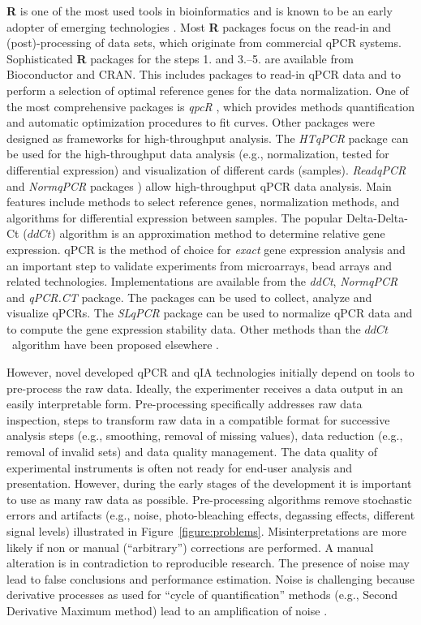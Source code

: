 \documentclass[twocolumn]{bmcart}%
\begin{document}
  \textbf{R} is one of the most used tools in bioinformatics and is known to be 
an early adopter of emerging technologies \cite{pabinger_2014}. Most \textbf{R} 
packages focus on the read-in and (post)-processing of data sets, which 
originate from commercial qPCR systems. Sophisticated 
\textbf{R} packages for the steps 1. and 3.--5. are available 
from Bioconductor and CRAN. This includes packages to read-in qPCR data and to 
perform a selection of optimal reference genes for the data normalization. One 
of the most comprehensive packages is \emph{qpcR} \cite{ritz_2008}, which 
provides methods quantification and automatic optimization procedures to fit 
curves. Other packages were designed as frameworks for high-throughput 
analysis. The \emph{HTqPCR} package \cite{Dvinge_2009} can be used for the 
high-throughput data analysis (e.g., normalization, tested for differential 
expression) and visualization of different cards (samples). \emph{ReadqPCR} and 
\emph{NormqPCR} packages \cite{perkins_2012}) allow high-throughput qPCR data 
analysis. Main features include methods to select reference genes, 
normalization methods, and algorithms for differential expression between 
samples. The popular Delta-Delta-Ct ($ddCt$) algorithm \cite{livak_2001} is an 
approximation method to determine relative gene expression. qPCR is the method 
of choice for \emph{exact} gene expression analysis and an important step to 
validate experiments from microarrays, bead arrays and related technologies. 
Implementations are available from the \emph{ddCt}, \emph{NormqPCR} and 
\emph{qPCR.CT} package. The packages can be used to collect, analyze and 
visualize qPCRs. The \emph{SLqPCR} package can be used to normalize qPCR data 
and to compute the gene expression stability data. Other methods than the 
$ddCt$~algorithm have been proposed elsewhere \cite{heckmann_2011}.

However, novel developed qPCR and qIA technologies initially depend on tools to 
pre-process the raw data. Ideally, the experimenter 
receives a data output in an 
easily interpretable form. Pre-processing specifically addresses raw data 
inspection, steps to transform raw data in a compatible format for successive 
analysis steps (e.g., smoothing, removal of missing values), data reduction 
(e.g., removal of invalid sets) and data quality management. The data quality of 
experimental instruments is often not ready for end-user analysis and 
presentation. However, during the early stages of the development it is 
important to use as many raw data as possible. Pre-processing algorithms remove 
stochastic errors and artifacts (e.g., noise, photo-bleaching effects, degassing 
effects, different signal levels) illustrated in Figure~\ref{figure:problems}. 
Misinterpretations are more likely if non or manual (``arbitrary'') corrections 
are performed. A manual alteration is in contradiction to reproducible research. 
The presence of noise may lead to false conclusions and performance estimation. 
Noise is challenging because derivative processes as used for ``cycle of 
quantification'' methods (e.g., Second Derivative Maximum method) lead to an 
amplification of noise \cite{roediger_RJ_2013, larionov_2005, tuomi_2010, 
ruijter_2013, tellinghuisen_2014}.
\end{document}
